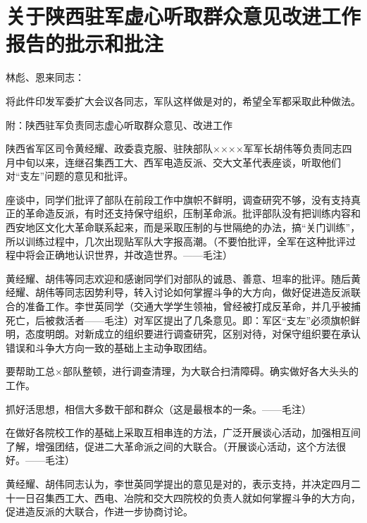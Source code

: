 \section[关于陕西驻军虚心听取群众意见改进工作报告的批示和批注（一九六七年四月二十三日）]{关于陕西驻军虚心听取群众意见改进工作报告的批示和批注}


林彪、恩来同志：

将此件印发军委扩大会议各同志，军队这样做是对的，希望全军都采取此种做法。

附：陕西驻军负责同志虚心听取群众意见、改进工作

陕西省军区司令黄经耀、政委袁克服、驻陕部队××××军军长胡伟等负责同志四月中旬以来，连继召集西工大、西军电造反派、交大文革代表座谈，听取他们对“支左”问题的意见和批评。

座谈中，同学们批评了部队在前段工作中旗帜不鲜明，调查研究不够，没有支持真正的革命造反派，有时还支持保守组织，压制革命派。批评部队没有把训练内容和西安地区文化大革命联系起来，而是采取压制的与世隔绝的办法，搞“关门训练”，所以训练过程中，几次出现贴军队大字报高潮。（不要怕批评，全军在这种批评过程中将会正确地认识世界，并改造世界。——毛注）

黄经耀、胡伟等同志欢迎和感谢同学们对部队的诚恳、善意、坦率的批评。随后黄经耀、胡伟等同志因势利导，转入讨论如何掌握斗争的大方向，做好促进造反派联合的准备工作。李世英同学（交通大学学生领袖，曾经被打成反革命，并几乎被捕死亡，后被救活者——毛注）对军区提出了几条意见。即：军区“支左”必须旗帜鲜明，态度明朗。对新成立的组织要进行调查研究，区别对待，对保守组织要在承认错误和斗争大方向一致的基础上主动争取团结。

要帮助工总×部队整顿，进行调查清理，为大联合扫清障碍。确实做好各大头头的工作。

抓好活思想，相信大多数干部和群众（这是最根本的一条。——毛注）

在做好各院校工作的基础上采取互相串连的方法，广泛开展谈心活动，加强相互间了解，增强团结，促进二大革命派之间的大联合。（开展谈心活动，这个方法很好。——毛注）

黄经耀、胡伟同志认为，李世英同学提出的意见是对的，表示支持，并决定四月二十一日召集西工大、西电、冶院和交大四院校的负责人就如何掌握斗争的大方向，促进造反派的大联合，作进一步协商讨论。


